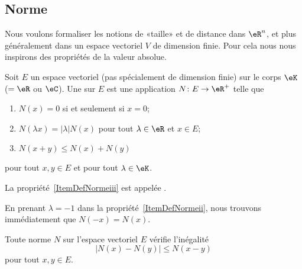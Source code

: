 \subsection{Norme}

Nous voulons formaliser les notions de «taille» et de distance dans $\eR^n$, et plus généralement dans un espace vectoriel $V$ de dimension finie. Pour cela nous nous inspirons des propriétés de la valeur absolue.

\begin{definition}  \label{DefNorme}
    Soit \( E\) un espace vectoriel (pas spécialement de dimension finie) sur le corps \( \eK\) (\( =\eR\) ou \( \eC\)). Une   sur $E$ est une application $N\colon E\to \eR^+$ telle que
	\begin{enumerate}
		\item
            \( N(x)=0\) si et seulement si \( x=0\);
		\item\label{ItemDefNormeii}
			$N(\lambda x)=| \lambda |N(x)$ pour tout $\lambda\in\eR$ et $x\in E$;
		\item\label{ItemDefNormeiii}
			$N(x+y)\leq N(x)+N(y)$
	\end{enumerate}
    pour tout $x,y\in E$ et pour tout $\lambda\in\eK$.

    La propriété~\ref{ItemDefNormeiii} est appelée .
\end{definition}
En prenant $\lambda=-1$ dans la propriété~\ref{ItemDefNormeii}, nous trouvons immédiatement que $N(-x)=N(x)$.

\begin{proposition}		\label{PropNmNNm}
	Toute norme $N$ sur l'espace vectoriel $E$ vérifie l'inégalité
	\begin{equation}
		\big| N(x)-N(y) \big|\leq N(x-y)
	\end{equation}
	pour tout $x,y\in E$.
\end{proposition}


